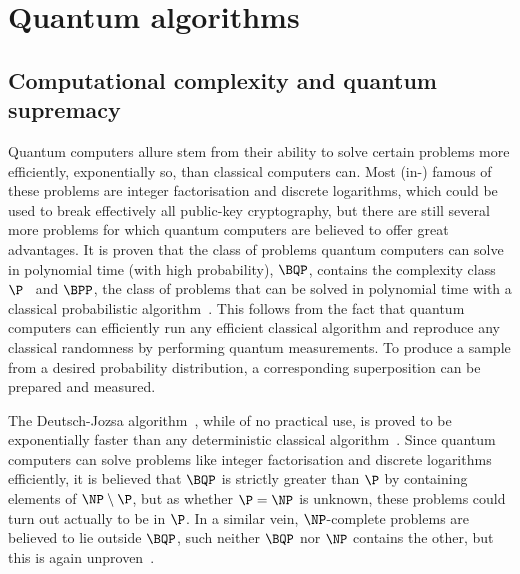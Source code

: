 \section{Quantum algorithms}
\subsection{Computational complexity and quantum supremacy}
Quantum computers allure stem from their ability to solve certain problems more efficiently, exponentially so, than classical computers can.
Most (in-) famous of these problems are integer factorisation and discrete logarithms, which could be used to break effectively all public-key cryptography, but there are still several more problems for which quantum computers are believed to offer great advantages.
It is proven that the class of problems quantum computers can solve in polynomial time (with high probability), $\BQP$, contains the complexity class $\P$~\autocite{nielsen2012} and $\BPP$, the class of problems that can be solved in polynomial time with a classical probabilistic algorithm~\autocite{nielsen2012}.
This follows from the fact that quantum computers can efficiently run any efficient classical algorithm and reproduce any classical randomness by performing quantum measurements.
To produce a sample from a desired probability distribution, a corresponding superposition can be prepared and measured.

The Deutsch-Jozsa algorithm~\autocite{deutsch1992}, while of no practical use, is proved to be exponentially faster than any deterministic classical algorithm\footnotemark~\autocite{simon1994}.
Since quantum computers can solve problems like integer factorisation and discrete logarithms efficiently, it is believed that $\BQP$ is strictly greater than $\P$ by containing elements of $\NP \setminus \P$, but as whether $\P = \NP$ is unknown, these problems could turn out actually to be in $\P$.
In a similar vein, $\NP$-complete problems are believed to lie outside $\BQP$, such neither $\BQP$ nor $\NP$ contains the other, but this is again unproven~\autocite{aaronson2010}.


